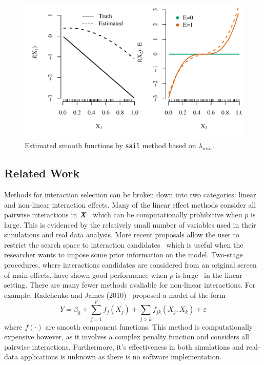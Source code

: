\documentclass[12pt,letter]{article}\usepackage[]{graphicx}\usepackage[]{color}
\newenvironment{knitrout}{}{} %
\newcommand{\bX}{\textbf{\emph{X}}}
\begin{document}
\begin{knitrout}\scriptsize
{}\color{fgcolor}\begin{figure}[H]

{\centering \includegraphics[width=1\linewidth]{figure/toy-effects-1} 

}

\caption[Estimated smooth functions by \texttt{sail} method based on $\lambda_{min}$]{Estimated smooth functions by \texttt{sail} method based on $\lambda_{min}$.}\label{fig:toy-effects}
\end{figure}


\end{knitrout}


\subsection{Related Work}
Methods for interaction selection can be broken down into two categories: linear and non-linear interaction effects. 
Many of the linear effect methods consider all pairwise interactions in $\bX$~\citep{zhao2009composite,choi2010variable,bien2013lasso, she2014group} which can be computationally prohibitive when $p$ is large. This is evidenced by the relatively small number of variables used in their simulations and real data analysis. 
More recent proposals allow the user to restrict the search space to interaction candidates~\citep{lim2015learning,haris2016convex} which is useful when the researcher wants to impose some prior information on the model. 
Two-stage procedures, where interactions candidates are considered from an original screen of main effects, have shown good performance when $p$ is large~\citep{hao2018model,shah2016modelling} in the linear setting.  
There are many fewer methods avaliable for non-linear interactions. For example, Radchenko and James (2010)~\citep{radchenko2010variable} proposed a model of the form
\[Y = \beta_0 + \sum_{j=1}^{p} f_j(X_j) + \sum_{j>k}f_{jk}(X_j, X_k) + \varepsilon\]
where $f(\cdot)$ are smooth component functions. This method is computationally expensive however, as it involves a complex penalty function and considers all pairwise interactions. 
Furthermore, it's effectiveness in both simulations and real-data applications is unknown as there is no software implementation.  
\end{document}
